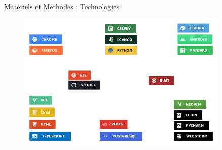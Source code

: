 \documentclass{beamer}
\begin{document}
\begin{frame}{Matériels et Méthodes : \small{Technologies}}
  \begin{figure}[H]
    \centering
    \includegraphics[width=0.9\textwidth]{tools}
\end{figure}
\end{frame}
\end{document}
